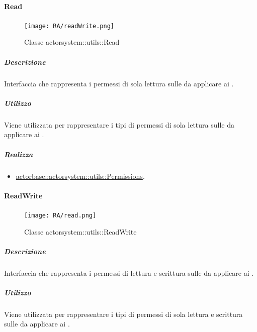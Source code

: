 \documentclass{scalatekids-article}
\begin{document}

\paragraph{Read}
\label{sec:actorbase::actorsystem::utils::Read}

\begin{figure}[H]
  \begin{center}
    \texttt{[image: RA/readWrite.png]}
    \caption{Classe actorsystem::utils::Read}
  \end{center}
\end{figure}

\subparagraph{Descrizione}

Interfaccia che rappresenta i permessi di sola lettura sulle 
da applicare ai .

\subparagraph{Utilizzo}

Viene utilizzata per rappresentare i tipi di permessi di sola lettura sulle
 da applicare ai .

\subparagraph{Realizza}

\begin{itemize}
\item \hyperref[sec:actorbase::actorsystem::utils::Read]{actorbase::actorsystem::utils::Permissions}.
\end{itemize}

\paragraph{ReadWrite}
\label{sec:actorbase::actorsystem::utils::ReadWrite}

\begin{figure}[H]
  \begin{center}
    \texttt{[image: RA/read.png]}
    \caption{Classe actorsystem::utils::ReadWrite}
  \end{center}
\end{figure}

\subparagraph{Descrizione}

Interfaccia che rappresenta i permessi di lettura e scrittura sulle
 da applicare ai .

\subparagraph{Utilizzo}

Viene utilizzata per rappresentare i tipi di permessi di sola lettura e
scrittura sulle  da applicare ai .
\end{document}
